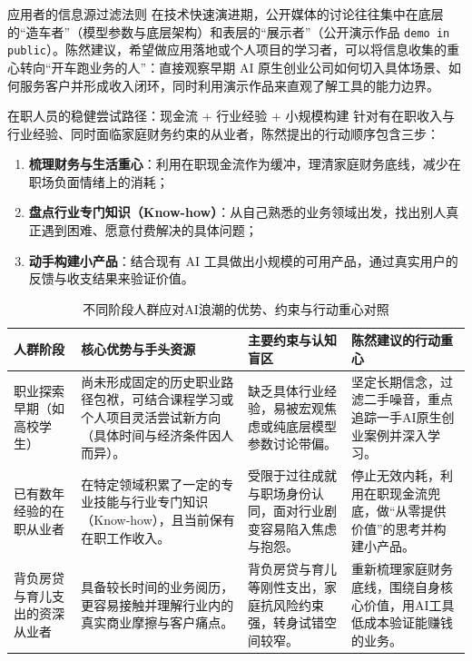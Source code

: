 \documentclass[UTF8,a4paper,11pt,fontset=fandol]{ctexart}
\begin{document}
\begin{knowledgebox}{应用者的信息源过滤法则}
在技术快速演进期，公开媒体的讨论往往集中在底层的“造车者”（模型参数与底层架构）和表层的“展示者”（公开演示作品 \texttt{demo in public}）。陈然建议，希望做应用落地或个人项目的学习者，可以将信息收集的重心转向“开车跑业务的人”：直接观察早期 AI 原生创业公司如何切入具体场景、如何服务客户并形成收入闭环，同时利用演示作品来直观了解工具的能力边界。
\end{knowledgebox}
\begin{importantbox}{在职人员的稳健尝试路径：现金流 + 行业经验 + 小规模构建}
针对有在职收入与行业经验、同时面临家庭财务约束的从业者，陈然提出的行动顺序包含三步：
\begin{enumerate}
\item \textbf{梳理财务与生活重心}：利用在职现金流作为缓冲，理清家庭财务底线，减少在职场负面情绪上的消耗；
\item \textbf{盘点行业专门知识（Know-how）}：从自己熟悉的业务领域出发，找出别人真正遇到困难、愿意付费解决的具体问题；
\item \textbf{动手构建小产品}：结合现有 AI 工具做出小规模的可用产品，通过真实用户的反馈与收支结果来验证价值。
\end{enumerate}
\end{importantbox}
\begin{table}[H]\centering\small
\caption{不同阶段人群应对AI浪潮的优势、约束与行动重心对照}
\begin{tabular}{>{\raggedright\arraybackslash}p{\dimexpr(\linewidth-8\tabcolsep)/4\relax}>{\raggedright\arraybackslash}p{\dimexpr(\linewidth-8\tabcolsep)/4\relax}>{\raggedright\arraybackslash}p{\dimexpr(\linewidth-8\tabcolsep)/4\relax}>{\raggedright\arraybackslash}p{\dimexpr(\linewidth-8\tabcolsep)/4\relax}}
\toprule
人群阶段 & 核心优势与手头资源 & 主要约束与认知盲区 & 陈然建议的行动重心\\\midrule
职业探索早期（如高校学生） & 尚未形成固定的历史职业路径包袱，可结合课程学习或个人项目灵活尝试新方向（具体时间与经济条件因人而异）。 & 缺乏具体行业经验，易被宏观焦虑或纯底层模型参数讨论带偏。 & 坚定长期信念，过滤二手噪音，重点追踪一手AI原生创业案例并深入学习。\\[4pt]
已有数年经验的在职从业者 & 在特定领域积累了一定的专业技能与行业专门知识（Know-how），且当前保有在职工作收入。 & 受限于过往成就与职场身份认同，面对行业剧变容易陷入焦虑与抱怨。 & 停止无效内耗，利用在职现金流兜底，做“从零提供价值”的思考并构建小产品。\\[4pt]
背负房贷与育儿支出的资深从业者 & 具备较长时间的业务阅历，更容易接触并理解行业内的真实商业摩擦与客户痛点。 & 背负房贷与育儿等刚性支出，家庭抗风险约束强，转身试错空间较窄。 & 重新梳理家庭财务底线，围绕自身核心价值，用AI工具低成本验证能赚钱的业务。\\[4pt]
\bottomrule\end{tabular}\end{table}
\end{document}
